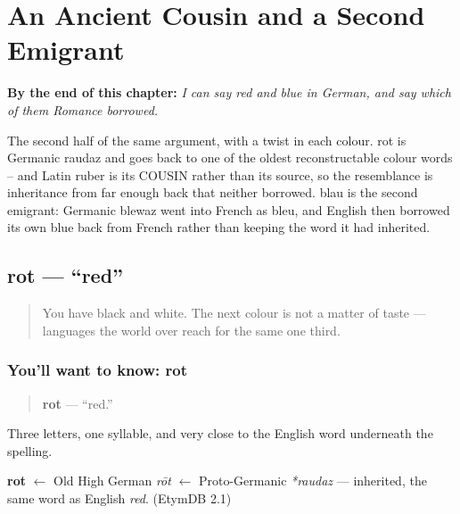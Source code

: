 
\chapter{An Ancient Cousin and a Second Emigrant}
\label{ch:rot-blau}

\begin{chapteropening}
\textbf{By the end of this chapter:} \emph{I can say red and blue in German, and say which of them Romance borrowed.}

The second half of the same argument, with a twist in each colour. rot is Germanic raudaz and goes back to one of the oldest reconstructable colour words -- and Latin ruber is its COUSIN rather than its source, so the resemblance is inheritance from far enough back that neither borrowed. blau is the second emigrant: Germanic blewaz went into French as bleu, and English then borrowed its own blue back from French rather than keeping the word it had inherited.
\end{chapteropening}

\section[rot]{rot — \textquotedblleft{}red\textquotedblright{}}

\label{lesson:GE-C13-rot}



\begin{quote}
You have black and white. The next colour is not a matter of taste — languages the world over reach for the same one third.
\end{quote}

\subsection*{You'll want to know: rot}
\begin{quote}
\textbf{rot} — \textquotedblleft{}red.\textquotedblright{}
\end{quote}

Three letters, one syllable, and very close to the English word underneath the spelling.

\begin{cousinweb}
\textbf{rot} $\leftarrow$ Old High German \emph{rōt} $\leftarrow$ Proto-Germanic \emph{*raudaz} — inherited, the same word as English \emph{red}. (EtymDB 2.1)
\end{cousinweb}

